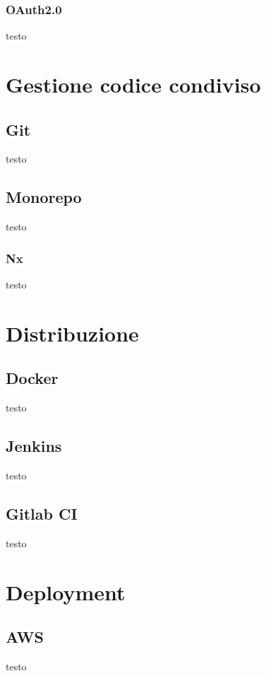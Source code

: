 \subsubsection{OAuth2.0}
testo

\section{Gestione codice condiviso}
\subsection{Git}
testo

\subsection{Monorepo}
testo
\subsubsection{Nx}
testo

\section{Distribuzione}
\subsection{Docker}
testo
\subsection{Jenkins}
testo
\subsection{Gitlab CI}
testo

\section{Deployment}
\subsection{AWS}
testo
